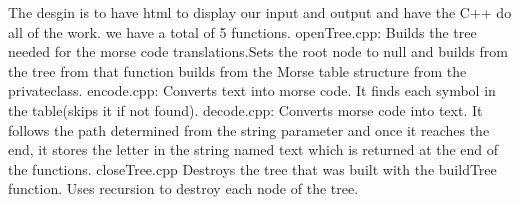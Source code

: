 The desgin is to have html to display our input and output and have the C++ do all of the work. we have a total of 5 functions. open\+Tree.\+cpp\+: Builds the tree needed for the morse code translations.\+Sets the root node to null and builds from the tree from that function builds from the Morse table structure from the privateclass. encode.\+cpp\+: Converts text into morse code. It finds each symbol in the table(skips it if not found). decode.\+cpp\+: Converts morse code into text. It follows the path determined from the string parameter and once it reaches the end, it stores the letter in the string named text which is returned at the end of the functions. close\+Tree.\+cpp Destroys the tree that was built with the build\+Tree function. Uses recursion to destroy each node of the tree. 